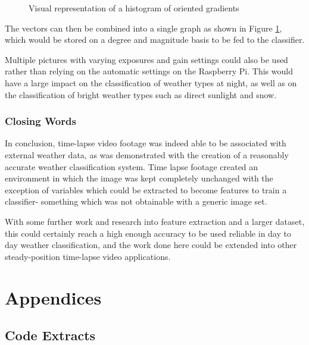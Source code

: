 \documentclass[a4paper,12pt,twoside]{report}
\begin{document}
\begin{figure}[H]
  \centering
  
  \caption{Visual representation of a histogram of oriented gradients}
  \label{ahog}
\end{figure}

The vectors can then be combined into a single graph as shown in Figure \ref{ahog}, which would be stored on a degree and magnitude basis to be fed to the classifier.

Multiple pictures with varying exposures and gain settings could also be used rather than relying on the automatic settings on the Raspberry Pi. This would have a large impact on the classification of weather types at night, as well as on the classification of bright weather types such as direct sunlight and snow.

\subsection{Closing Words}
In conclusion, time-lapse video footage was indeed able to be associated with external weather data, as was demonstrated with the creation of a reasonably accurate weather classification system. Time lapse footage created an environment in which the image was kept completely unchanged with the exception of variables which could be extracted to become features to train a classifier- something which was not obtainable with a generic image set.

With some further work and research into feature extraction and a larger dataset, this could certainly reach a high enough accuracy to be used reliable in day to day weather classification, and the work done here could be extended into other steady-position time-lapse video applications.


{}

\chapter{Appendices}
\section{Code Extracts}

\end{document}
